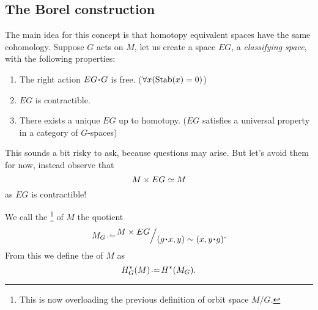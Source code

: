 \documentclass[12pt]{memoir}
\begin{document}
\subsection{The Borel construction}

The main idea for this concept is that homotopy equivalent spaces have the same cohomology. Suppose $G$ acts on $M$, let us create a space $EG$, a \emph{classifying space}, with the following properties:

\begin{enumerate}
    \item The right action $EG\. G$ is free. ($\forall x(\operatorname{Stab}(x)=0)$)
    \item $EG$ is contractible. 
    \item There exists a unique $EG$ up to homotopy. ($EG$ satisfies a universal property in a category of $G$-spaces)
\end{enumerate}

This sounds a bit risky to ask, because questions may arise. But let's avoid them for now, instead observe that 
$$M\times EG\simeq M$$
as $EG$ is contractible! 

\begin{Def}
    We call the \footnote{This is now overloading the previous definition of orbit space $M/G$.} of $M$ the quotient
    $$M_G\defeq\quot{M\x EG}{(g\.x,y)\sim(x,y\.g)}.$$
    From this we define the  of $M$ as 
    $$H_G^\ast(M)\defeq H^\ast(M_G).$$
\end{Def}
\end{document}
